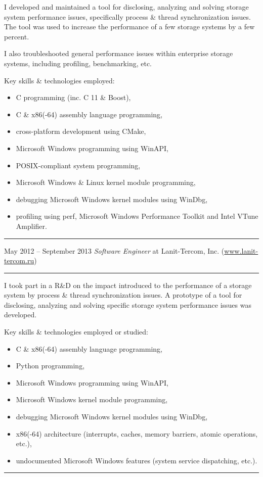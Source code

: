 \documentclass[11pt]{article}
\newcommand\CXX{%
  C\nolinebreak[4]\hspace{-.05em}\raisebox{.4ex}{\relsize{-3}{\textbf{++}}}%
}
\newcommand\CvSmallSkipLength{0.5em}
\newcommand\CvSkip[1]{\vspace{#1}}
\newcommand\CvSmallSkip{\CvSkip{\CvSmallSkipLength}}
\newcommand\CvRule{\begingroup\color{CvRuleColor}\hrule\endgroup}
\newcommand\CvWorkplaceHeader[5]{\begingroup%
  \CvRule
  \fboxsep0pt%
  \colorbox{CvWorkplaceHeaderColor}{%
    \begin{minipage}{\linewidth-2\fboxsep}%
\CvSmallSkip
#1 -- #2 \hfill \textit{#3} at #4 (\href{http://#5/}{#5})
\CvSmallSkip
    \end{minipage}%
  }%
  \CvRule
\endgroup}
\newenvironment{CvWorkplaceDescription}{%
    \begingroup\setlength\parskip{\CvSmallSkipLength}%
  }{%
    \CvSmallSkip\endgroup%
  }
\begin{document}
\begin{CvWorkplaceDescription}
I developed and maintained a tool for disclosing, analyzing and solving storage system performance issues, specifically process \& thread synchronization issues.
The tool was used to increase the performance of a few storage systems by a few percent.

I also troubleshooted general performance issues within enterprise storage systems, including profiling, benchmarking, etc.

Key skills \& technologies employed:
\begin{itemize}[noitemsep]
\item {\CXX} programming (inc. {\CXX}11 \& Boost),
\item C \& x86(-64) assembly language programming,
\item cross-platform development using CMake,
\item Microsoft Windows programming using WinAPI,
\item POSIX-compliant system programming,
\item Microsoft Windows \& Linux kernel module programming,
\item debugging Microsoft Windows kernel modules using WinDbg,
\item profiling using perf, Microsoft Windows Performance Toolkit and Intel VTune Amplifier.
\end{itemize}
\end{CvWorkplaceDescription}

\CvWorkplaceHeader{May 2012}{September 2013}{Software Engineer}{Lanit-Tercom, Inc.}{www.lanit-tercom.ru}

\begin{CvWorkplaceDescription}
I took part in a R\&D on the impact introduced to the performance of a storage system by process \& thread synchronization issues.
A prototype of a tool for disclosing, analyzing and solving specific storage system performance issues was developed.

Key skills \& technologies employed or studied:
\begin{itemize}[noitemsep]
\item C \& x86(-64) assembly language programming,
\item Python programming,
\item Microsoft Windows programming using WinAPI,
\item Microsoft Windows kernel module programming,
\item debugging Microsoft Windows kernel modules using WinDbg,
\item x86(-64) architecture (interrupts, caches, memory barriers, atomic operations, etc.),
\item undocumented Microsoft Windows features (system service dispatching, etc.).
\end{itemize}
\end{CvWorkplaceDescription}
\CvRule
\end{document}

